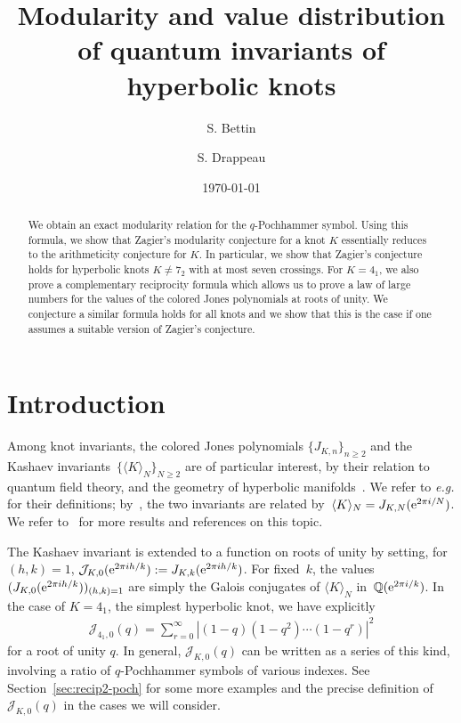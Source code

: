 \documentclass[11pt]{amsart}
\title[Modularity and distribution of quantum knots invariants]{Modularity and value distribution of quantum invariants of hyperbolic knots}
\date{\today}
\author{S. Bettin}
\author{S. Drappeau}
\newcommand{\Q}{\mathbb{Q}}
\newcommand{\ang}[1]{\langle#1\rangle}
\newcommand{\J}{\mathcal{J}}
\theoremstyle{definition}
\newcommand{\pr}[1]{\mathchoice{\left( #1\right)}{(#1)}{(#1)}{(#1)}}
\newcommand{\e}[1][]{\ifthenelse{\equal{#1}{}}{{\rm e}}{\operatorname{e}\pr{ #1}}}
\newcommand{\1}{{\mathbf 1}}
\let\originalleft\left
\let\originalright\right
\renewcommand{\left}{\mathopen{}\mathclose\bgroup\originalleft}
\renewcommand{\right}{\aftergroup\egroup\originalright}
\numberwithin{equation}{section}
\begin{document}
\begin{abstract}
  We obtain an exact modularity relation for the $q$-Pochhammer symbol. Using this formula, we show that Zagier's modularity conjecture for a knot $K$ essentially reduces to the arithmeticity conjecture for $K$. In particular, we show that Zagier's conjecture holds for hyperbolic knots $K\neq 7_2$ with at most seven crossings.
  For $K=4_1$, we also prove a complementary reciprocity formula which allows us to prove a law of large numbers for the values of the colored Jones polynomials at roots of unity. We conjecture a similar formula holds for all knots and we show that this is the case if one assumes a suitable version of Zagier's conjecture.
\end{abstract}



\maketitle


\section{Introduction}



Among knot invariants, the colored Jones polynomials $\{J_{K,n}\}_{n\geq2}$ and the Kashaev invariants~$\{\ang{K}_N\}_{N\geq 2}$ are of particular interest, by their relation to quantum field theory, and the geometry of hyperbolic manifolds~\cite{Witten1994, MurakamiMurakami2001}. We refer to \textit{e.g.} \cite{MurakamiMurakami2001, Yokota2011} for their definitions; by~\cite{MurakamiMurakami2001}, the two invariants are related by~$\ang{K}_N=J_{K,N}(\e^{2\pi i /N})$. We refer to~\cite{Jones,Kashaev1995,Champanerkar_etal} for more results and references on this topic.

The Kashaev invariant is extended to a function on roots of unity by setting, for~$(h, k)=1$, 
$\J_{K,0}(\e^{2\pi i h/k}):=J_{K,k}(\e^{2\pi i h/k})$. For fixed~$k$, the values~$(J_{K,0}(\e^{2\pi i h/k}))_{(h, k)=1}$ are simply the Galois conjugates of $\ang{K}_N $ in~$\Q(\e^{2\pi i / k})$.
In the case of $K=4_1$, the simplest hyperbolic knot, we have explicitly
\begin{align}\label{jones41}
  \J_{4_1,0}(q)= \sum_{r=0}^{\infty} | (1-q)(1-q^2)\dotsb (1-q^r)|^2
\end{align}
for a root of unity $q$. In general, $\J_{K,0}(q)$ can be written as a series of this kind, involving a ratio of $q$-Pochhammer symbols of various indexes. See Section~\ref{sec:recip2-poch} for some more examples and the precise definition of~$\J_{K,0}(q)$ in the cases we will consider.
\end{document}
